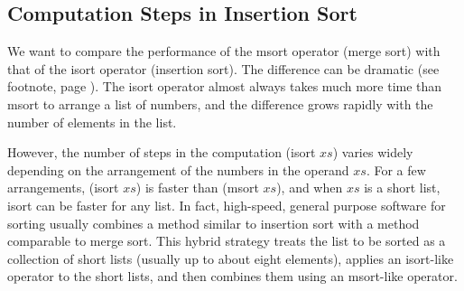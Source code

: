 \begin{exercises}




\end{exercises}

\subsection{Computation Steps in Insertion Sort}
\label{subsec:isort-steps}

We want to compare the performance of
the \textsf{msort} operator (merge sort)
with that of the \textsf{isort} operator (insertion sort).
The difference can be dramatic
(see footnote, page \pageref{bubble-vs-quicksort-example}).
The \textsf{isort} operator almost always
takes much more time than \textsf{msort}
to arrange a list of numbers,
and the difference grows rapidly with the number of elements in the list.

However, the number of steps in the computation \textsf{(isort $xs$)}
varies widely depending on the arrangement of the numbers in the operand $xs$.
For a few arrangements,
\textsf{(isort $xs$)} is faster than \textsf{(msort $xs$)},
and when $xs$ is a short list, \textsf{isort} can be faster for any list.
In fact, high-speed, general purpose software for sorting
usually combines a method similar to insertion sort
with a method comparable to merge sort.
This hybrid strategy treats
the list to be sorted as a collection of short lists
(usually up to about eight elements),
applies an \textsf{isort}-like operator to the short lists,
and then combines them
using an \textsf{msort}-like operator.

